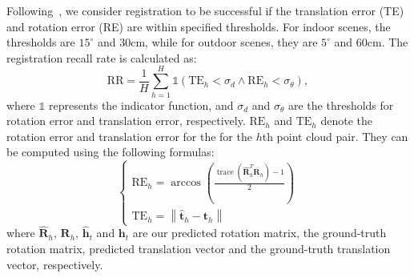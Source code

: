 Following~\cite{PointDSC,chen2022sc2}, we consider registration to be successful if the translation error (TE) and rotation error (RE) are within specified thresholds. For indoor scenes, the thresholds are $15^{\circ}$ and $30$cm, while for outdoor scenes, they are 
$5^{\circ}$ and $60$cm. The registration recall rate is calculated as:
\begin{equation}
    \mathrm{RR}=\frac{1}{H} \sum_{h=1}^H \mathds {1}\left(\mathrm{TE}_h<\sigma_d  \wedge  \mathrm{RE}_h<\sigma_\theta\right),
\end{equation}
where
$\mathds {1}$ represents the indicator function, and 
$\sigma_d$ and $\sigma_\theta $ are the thresholds for rotation error and translation error, respectively. $\mathrm{RE}_h$ and 
$\mathrm{TE}_h$ denote the rotation error and translation error for the 
for the $h$th point cloud pair. They can be computed using the following formulas:
\begin{equation}
    \begin{cases}
        \mathrm{RE}_h=\arccos \left(\frac{\operatorname{trace}\left(\hat{\mathbf{R}}_h^T \mathbf{R}_h\right)-1}{2}\right) \\
        \mathrm{TE}_h=\left\|\hat{\mathbf{t}}_h-\mathbf{t}_h\right\|
    \end{cases}
\end{equation}
where $\hat{\mathbf{R}}_h$, $\mathbf{R}_h$, $\hat{\mathbf{h}}_t$ and $\mathbf{h}_t$ are our predicted rotation matrix, the ground-truth rotation matrix,
predicted translation vector and the ground-truth translation vector, respectively.


\begin{table*}[htbp]
    \centering
    \caption{Information of all tested datasets.}
    \label{tested datasets}
\end{table*}


